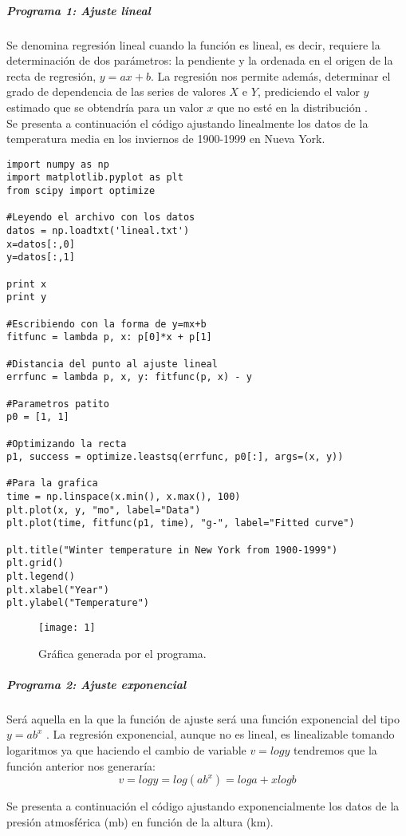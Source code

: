 \documentclass[12pt]{article}
\begin{document}
\subparagraph*{Programa 1: Ajuste lineal}
Se denomina regresión lineal cuando la función es lineal, es decir, requiere la determinación de dos parámetros: la pendiente y la ordenada en el origen de la recta de regresión, $y=ax+b$. La regresión nos permite además, determinar el grado de dependencia de las series de valores $X$ e $Y$, prediciendo el valor $y$ estimado que se obtendría para un valor $x$ que no esté en la distribución \cite{RL}. \\

Se presenta a continuación el código ajustando linealmente los datos de la temperatura media en los inviernos de 1900-1999 en Nueva York.

\begin{verbatim}
import numpy as np
import matplotlib.pyplot as plt
from scipy import optimize

#Leyendo el archivo con los datos
datos = np.loadtxt('lineal.txt')
x=datos[:,0]
y=datos[:,1]

print x
print y

#Escribiendo con la forma de y=mx+b
fitfunc = lambda p, x: p[0]*x + p[1]

#Distancia del punto al ajuste lineal
errfunc = lambda p, x, y: fitfunc(p, x) - y 

#Parametros patito
p0 = [1, 1] 

#Optimizando la recta
p1, success = optimize.leastsq(errfunc, p0[:], args=(x, y))

#Para la grafica
time = np.linspace(x.min(), x.max(), 100)
plt.plot(x, y, "mo", label="Data") 
plt.plot(time, fitfunc(p1, time), "g-", label="Fitted curve")

plt.title("Winter temperature in New York from 1900-1999")
plt.grid()
plt.legend()
plt.xlabel("Year")
plt.ylabel("Temperature")
\end{verbatim}

\begin{figure}[H]
\centering
\texttt{[image: 1]}
\caption{Gráfica generada por el programa.}
\end{figure}

\subparagraph*{Programa 2: Ajuste exponencial}
Será aquella en la que la función de ajuste será una función exponencial del tipo $y = ab^x$ \cite{RE}. La regresión exponencial, aunque no es lineal, es linealizable tomando logaritmos ya que haciendo el cambio de variable $v=log y$ tendremos que la función anterior nos generaría: $$v=log y=log( ab^x)=log a + x log b $$

Se presenta a continuación el código ajustando exponencialmente los datos de la presión atmosférica (mb) en función de la altura (km).
\end{document}
